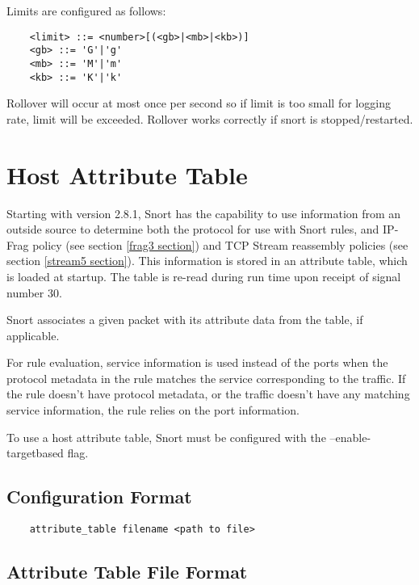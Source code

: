 \documentclass[english]{report}
\newenvironment{note}{
\samepage
    \vspace{10pt}{\textsf{
        {\hspace{7pt}\Huge{$\triangle$\hspace{-12.5pt}{\Large{$^!$}}}}\hspace{5pt}
        {\Large{NOTE}}
    }
    }
   \begin{center}
    \par\vspace{-17pt}

    \begin{lrbox}{\savepar}
    \begin{minipage}[r]{6in}
}
{
    \end{minipage}
    \end{lrbox}
    \fbox{
        \usebox{
            \savepar
	}
    }
    \par\vskip10pt
    \end{center}
}
\newenvironment{note}{
        \begin{rawhtml}
        <p><table border="1"><tr><td><b>
        Note:&nbsp;&nbsp;</b>
        \end{rawhtml}
}{
        \begin{rawhtml}
        </b></td></tr></table></p>
        \end{rawhtml}
}
\begin{document}
Limits are configured as follows:

\begin{verbatim}
    <limit> ::= <number>[(<gb>|<mb>|<kb>)]
    <gb> ::= 'G'|'g'
    <mb> ::= 'M'|'m'
    <kb> ::= 'K'|'k'
\end{verbatim}

Rollover will occur at most once per second so if limit is too small for
logging rate, limit will be exceeded.  Rollover works correctly if snort is
stopped/restarted.

\section{Host Attribute Table}
\label{targetbased}

Starting with version 2.8.1, Snort has the capability to use information from
an outside source to determine both the protocol for use with Snort rules, and
IP-Frag policy (see section \ref{frag3 section}) and TCP Stream reassembly
policies (see section \ref{stream5 section}).  This information is stored in an
attribute table, which is loaded at startup.  The table is re-read during run
time upon receipt of signal number 30.

Snort associates a given packet with its attribute data from the table, if
applicable.

For rule evaluation, service information is used instead of the ports when the
protocol metadata in the rule matches the service corresponding to the traffic.
If the rule doesn't have protocol metadata, or the traffic doesn't have any
matching service information, the rule relies on the port information.

\begin{note}

To use a host attribute table, Snort must be configured with the
--enable-targetbased flag.

\end{note}

\subsection{Configuration Format}

\begin{verbatim}
    attribute_table filename <path to file>
\end{verbatim}

\subsection{Attribute Table File Format}
\end{document}

